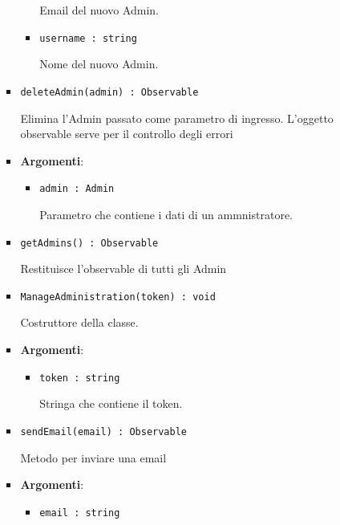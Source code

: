 \documentclass[../DefinizioneDiProdotto.tex]{subfiles}
\begin{document}
\begin{itemize}
\begin{itemize}
\begin{itemize}
\begin{itemize}
	 Email del nuovo Admin.
	\item \texttt{username : string}\

	 Nome del nuovo Admin.
	\end{itemize}
	\end{itemize}\vspace{0.5em}
	\begin{itemize}
	\item \texttt{deleteAdmin(admin) : Observable}\

	 Elimina l'Admin passato come parametro di ingresso. L'oggetto observable serve per il controllo degli errori

	\item \textbf{Argomenti}:
	\begin{itemize}
	\item \texttt{admin : Admin}\

	 Parametro che contiene i dati di un ammnistratore.
	\end{itemize}
	\end{itemize}\vspace{0.5em}
	\begin{itemize}
	\item \texttt{getAdmins() : Observable}\

	 Restituisce l'observable di tutti gli Admin
	\end{itemize}\vspace{0.5em}
	\begin{itemize}
	\item \texttt{ManageAdministration(token) : void}\

	 Costruttore della classe.

	\item \textbf{Argomenti}:
	\begin{itemize}
	\item \texttt{token : string}\

	 Stringa che contiene il token.
	\end{itemize}
	\end{itemize}\vspace{0.5em}
	\begin{itemize}
	\item \texttt{sendEmail(email) : Observable}\

	 Metodo per inviare una email

	\item \textbf{Argomenti}:
	\begin{itemize}
	\item \texttt{email : string}\


\end{itemize}
\end{itemize}
\end{itemize}
\end{itemize}
\end{document}
